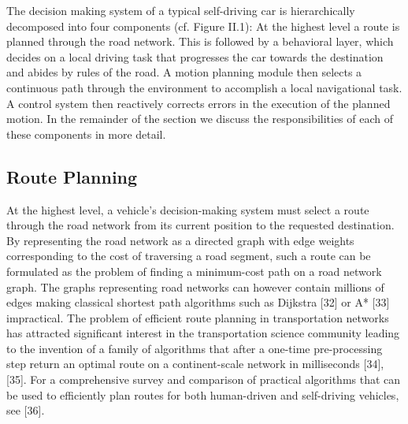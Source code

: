 \documentclass[a4paper,10pt]{article}
\begin{document}
The decision making system of a typical self-driving car is hierarchically decomposed into four components (cf. Figure II.1): At the highest level a route is planned through the road network. This is followed by a behavioral layer, which decides on a local driving task that progresses the car towards the destination and abides by rules of the road. A motion planning module then selects a continuous path through the environment to accomplish a local navigational task. A control system then reactively corrects errors in the execution of the planned motion. In the remainder of the section we discuss the responsibilities of each of these components in more detail.

\subsection{Route Planning}
At the highest level, a vehicle’s decision-making system must select a route through the road network from its current position to the requested destination. By representing the road network as a directed graph with edge weights corresponding to the cost of traversing a road segment, such a route can be formulated as the problem of finding a minimum-cost path on a road network graph. The graphs representing road networks can however contain millions of edges making classical shortest path algorithms such as Dijkstra [32] or A* [33] impractical. The problem of efficient route planning in transportation networks has attracted significant interest in the transportation science community leading to the invention of a family of algorithms that after a one-time pre-processing step return an optimal route on a continent-scale network in milliseconds [34], [35]. For a comprehensive survey and comparison of practical algorithms that can be used to efficiently plan routes for both human-driven and self-driving vehicles, see [36].
\end{document}
